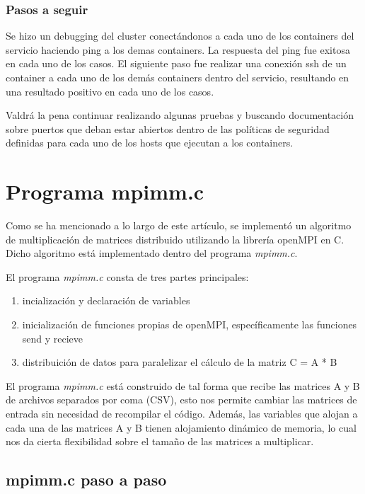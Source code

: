 \documentclass[DIV=calc, paper=letter, fontsize=11pt, twocolumn]{scrartcl}
\begin{document}
\subsubsection{Pasos a seguir}

Se hizo un debugging del cluster conectándonos a cada uno de los containers del servicio haciendo ping a los demas containers. La respuesta del ping fue exitosa en cada uno de los casos. El siguiente paso fue realizar una conexión ssh de un container a cada uno de los demás containers dentro del servicio, resultando en una resultado positivo en cada uno de los casos.

Valdrá la pena continuar realizando algunas pruebas y buscando documentación sobre puertos que deban estar abiertos dentro de las políticas de seguridad definidas para cada uno de los hosts que ejecutan a los containers.

\section{Programa mpimm.c}

Como se ha mencionado a lo largo de este artículo, se implementó un algoritmo de multiplicación de matrices distribuido utilizando la librería openMPI en C. Dicho algoritmo está implementado dentro del programa \textit{mpimm.c}.

El programa \textit{mpimm.c} consta de tres partes principales:

\begin{enumerate}
    \item incialización y declaración de variables
    \item inicialización de funciones propias de openMPI, específicamente las funciones send y recieve
    \item distribuición de datos para paralelizar el cálculo de la matriz C = A * B
\end{enumerate}

El programa \textit{mpimm.c} está construido de tal forma que recibe las matrices A y B de archivos separados por coma (CSV), esto nos permite cambiar las matrices de entrada sin necesidad de recompilar el código. Además, las variables que alojan a cada una de las matrices A y B tienen alojamiento dinámico de memoria, lo cual nos da cierta flexibilidad sobre el tamaño de las matrices a multiplicar.

\subsection{mpimm.c paso a paso}
\end{document}
